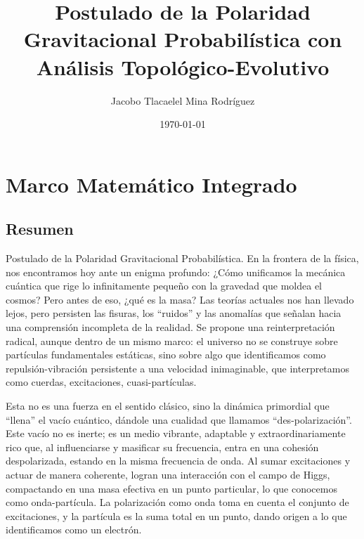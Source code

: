 \documentclass{book}
\begin{document}
\frontmatter
\title{Postulado de la Polaridad Gravitacional Probabilística con Análisis Topológico-Evolutivo}
\author{Jacobo Tlacaelel Mina Rodríguez}
\date{\today}
\maketitle

\tableofcontents

\mainmatter

\chapter*{Marco Matemático Integrado}

\section*{Resumen}
Postulado de la Polaridad Gravitacional Probabilística. En la frontera de la física, nos encontramos hoy ante un enigma profundo: ¿Cómo unificamos la mecánica cuántica que rige lo infinitamente pequeño con la gravedad que moldea el cosmos? Pero antes de eso, ¿qué es la masa? Las teorías actuales nos han llevado lejos, pero persisten las fisuras, los ``ruidos'' y las anomalías que señalan hacia una comprensión incompleta de la realidad. Se propone una reinterpretación radical, aunque dentro de un mismo marco: el universo no se construye sobre partículas fundamentales estáticas, sino sobre algo que identificamos como repulsión-vibración persistente a una velocidad inimaginable, que interpretamos como cuerdas, excitaciones, cuasi-partículas.

Esta no es una fuerza en el sentido clásico, sino la dinámica primordial que ``llena'' el vacío cuántico, dándole una cualidad que llamamos ``des-polarización''. Este vacío no es inerte; es un medio vibrante, adaptable y extraordinariamente rico que, al influenciarse y masificar su frecuencia, entra en una cohesión despolarizada, estando en la misma frecuencia de onda. Al sumar excitaciones y actuar de manera coherente, logran una interacción con el campo de Higgs, compactando en una masa efectiva en un punto particular, lo que conocemos como onda-partícula. La polarización como onda toma en cuenta el conjunto de excitaciones, y la partícula es la suma total en un punto, dando origen a lo que identificamos como un electrón.
\end{document}
